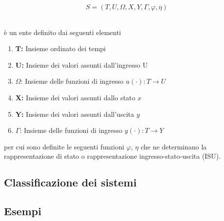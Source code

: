 \documentclass[../main.tex]{subfiles}
\begin{document}
\[S = (T,U,\Omega, X, Y, \Gamma, \varphi, \eta)\]\

è un ente definito dai seguenti elementi

\begin{enumerate}
	\item[\textbf{-}] \textbf{T:} Insieme ordinato dei tempi
	\item[\textbf{-}] \textbf{U:} Insieme dei valori assunti dall'ingresso U
	\item[\textbf{-}] $\Omega$: Insieme delle funzioni di ingresso $u(\cdot):T \rightarrow U$
	\item[\textbf{-}] \textbf{X:} Insieme dei valori assunti dallo stato $x$
	\item[\textbf{-}] \textbf{Y:} Insieme dei valori assunti dall'uscita $y$
	\item[\textbf{-}] $\Gamma$: Insieme delle funzioni di ingresso $y(\cdot):T \rightarrow Y$
\end{enumerate}

per cui sono definite le seguenti funzioni $\varphi$, $\eta$ che ne determinano la rappresentazione di stato o rappresentazione ingresso-stato-uscita (ISU).



\subsection{Classificazione dei sistemi}

\subsection{Esempi}
\end{document}
